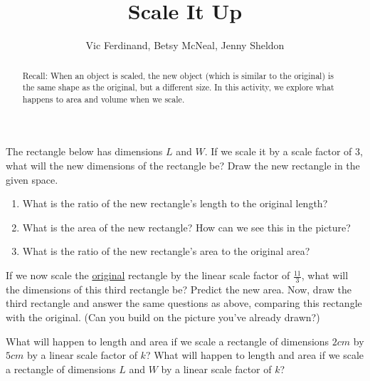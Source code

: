 \documentclass[nooutcomes]{ximera}
\title{Scale It Up}
\author{Vic Ferdinand, Betsy McNeal, Jenny Sheldon}
\begin{document}
\begin{abstract}
Recall: When an object is scaled, the new object (which is similar to the original) is the same shape as the original, but a different size.  In this activity, we explore what happens to area and volume when we scale.
\end{abstract}

\maketitle



\begin{problem} \label{ScaleItUp1}
The rectangle below has dimensions $L$ and $W$. If we scale it by a scale factor of 3, what will the new dimensions of the rectangle be? Draw the new rectangle in the given space.\\

 \hspace{4cm}
\vskip 2.5in

\begin{enumerate}
    \item What is the ratio of the new rectangle's length to the original  length?
    \item What is the area of the new rectangle?  How can we see this in the picture?
    \item What is the ratio of the new rectangle's area to the original area?
\end{enumerate}


\end{problem}

\begin{problem} \label{ScaleItUp2}
If we now scale the \underline{original} rectangle by the linear scale factor of $\frac{11}{3}$, what will the dimensions of this third rectangle be?  Predict the new area.  Now, draw the third rectangle and answer the same questions as above, comparing this rectangle with the original. (Can you build on the picture you've already drawn?)



\end{problem}


\begin{problem}
What will happen to length and area if we scale a rectangle of dimensions $2 cm$ by $5 cm$ by a linear scale factor of $k$? What will happen to length and area if we scale a rectangle of dimensions $L$ and $W$ by a linear scale factor of $k$?


\end{problem}
\end{document}
